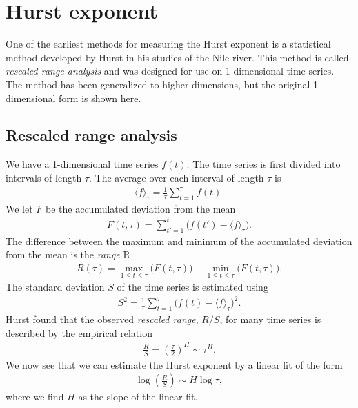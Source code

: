 \section{Hurst exponent}
One of the earliest methods for measuring the Hurst exponent is a statistical method developed by Hurst in his studies of the Nile river\cite{hurst1965longterm}\cite{hurst1951longterm}. This method is called \emph{rescaled range analysis} and was designed for use on 1-dimensional time series. The method has been generalized to higher dimensions\cite{fan2013rescaled}, but the original 1-dimensional form is shown here.
%

\subsection{Rescaled range analysis}
We have a 1-dimensional time series $f(t)$. The time series is first divided into intervals of length $\tau$. The average over each interval of length $\tau$ is
\begin{align*}
    \langle f \rangle_\tau = \frac{1}{\tau} \sum_{t=1}^\tau f(t).
\end{align*}
We let $F$ be the accumulated deviation from the mean
\begin{align*}
    F(t, \tau) = \sum_{t' = 1}^t \big( f(t') - \langle f \rangle_\tau \big).
\end{align*}
The difference between the maximum and minimum of the accumulated deviation from the mean is the \emph{range} R
\begin{align*}
    R(\tau) = \max_{1 \leq t \leq \tau} \big(F(t,\tau)\big) - \min_{1 \leq t \leq \tau} \big(F(t, \tau)\big).
\end{align*}
The standard deviation $S$ of the time series is estimated using
\begin{align*}
    S^2 = \frac{1}{\tau} \sum_{t=1}^\tau \big( f(t) - \langle f \rangle_\tau \big)^2.
\end{align*}
Hurst found that the observed \emph{rescaled range}, $R/S$, for many time series is described by the empirical relation\cite{feder1988fractals}
\begin{align*}
    \frac{R}{S} = \left(\frac{\tau}{2}\right)^H \sim \tau^H.
\end{align*}
We now see that we can estimate the Hurst exponent by a linear fit of the form
\begin{align*}
    \log \left(\frac{R}{S}\right) \sim H\log\tau,
\end{align*}
where we find $H$ as the slope of the linear fit.


